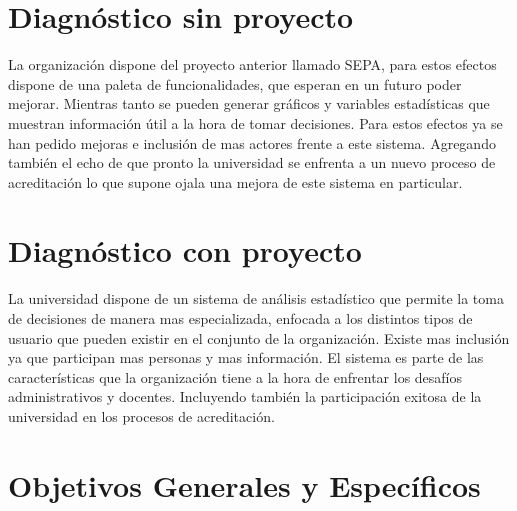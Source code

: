 \documentclass[a4paper,12pt,openany,oneside]{book}
\begin{document}
\section{Diagnóstico sin proyecto}
La organización dispone del proyecto anterior llamado SEPA, para estos efectos dispone de una paleta de funcionalidades, que esperan en un futuro poder mejorar. Mientras tanto se pueden generar gráficos y variables estadísticas que muestran información útil a la hora de tomar decisiones. Para estos efectos ya se han pedido mejoras e inclusión de mas actores frente a este sistema. Agregando también el echo de que pronto la universidad se enfrenta a un nuevo proceso de acreditación lo que supone ojala una mejora de este sistema en particular.
\section{Diagnóstico con proyecto}
La universidad dispone de un sistema de análisis estadístico que permite la toma de decisiones de manera mas especializada, enfocada a los distintos tipos de usuario que pueden existir en el conjunto de la organización. Existe mas inclusión ya que participan mas personas y mas información. El sistema  es parte de las características que la organización tiene a la hora de enfrentar los desafíos administrativos y docentes. Incluyendo también la participación exitosa de la universidad en los procesos de acreditación.
\section{Objetivos Generales y Específicos}
\end{document}
